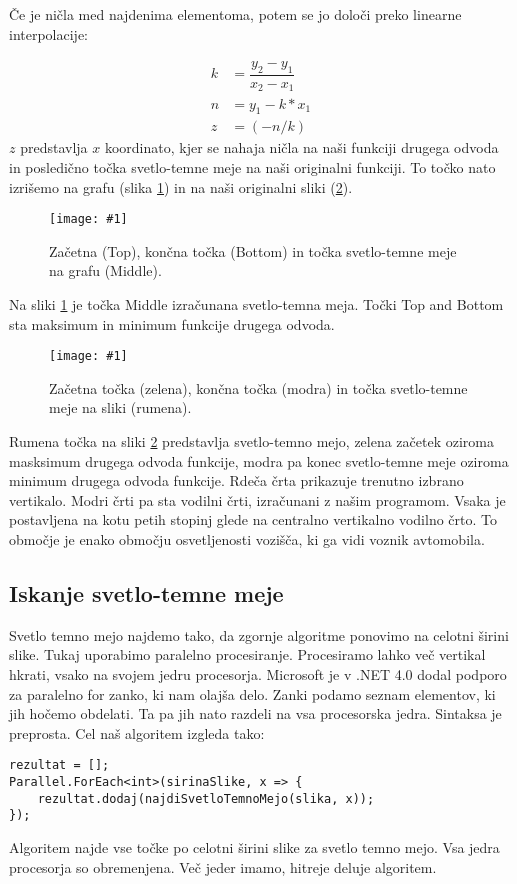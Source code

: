 \documentclass[oneside, a4paper, 12pt]{book}
\newcommand{\slika}[3]{
	\begin{figure}
	\begin{center}
	\texttt{[image: \#1]}
	\end{center}
	\vspace{-20pt}
	\caption{#2}
	\label{#3}
	\end{figure}
}
\begin{document}
Če je ničla med najdenima elementoma, potem se jo določi preko linearne interpolacije:

\begin{align}
k &= \dfrac{y_2-y_1}{x_2-x_1}  \nonumber\\
n &= y_1-k*x_1 \\
z &= (-n/k) \nonumber
\end{align} 
$z$ predstavlja $x$ koordinato, kjer se nahaja ničla na naši funkciji drugega odvoda in posledično točka svetlo-temne meje na naši originalni funkciji. To točko nato izrišemo na grafu (slika \ref{pic:svet-tem}) in na naši originalni sliki (\ref{pic:svet-tem2}).

\slika{slike/svetlo-temna-meja.jpg}{Začetna (Top), končna točka (Bottom) in točka svetlo-temne meje na grafu (Middle).}{pic:svet-tem}

Na sliki \ref{pic:svet-tem} je točka Middle izračunana svetlo-temna meja. Točki Top and Bottom sta maksimum in minimum funkcije drugega odvoda. 


\slika{slike/svetlo-temna-meja-orig-crop.jpg}{Začetna točka (zelena), končna točka (modra) in točka svetlo-temne meje na sliki (rumena).}{pic:svet-tem2}

Rumena točka na sliki \ref{pic:svet-tem2} predstavlja svetlo-temno mejo, zelena začetek oziroma masksimum drugega odvoda funkcije, modra pa konec svetlo-temne meje oziroma minimum drugega odvoda funkcije. Rdeča črta prikazuje trenutno izbrano vertikalo. Modri črti pa sta vodilni črti, izračunani z našim programom. Vsaka je postavljena na kotu petih stopinj glede na centralno vertikalno vodilno črto. To območje je enako območju osvetljenosti vozišča, ki ga vidi voznik avtomobila.


\subsection{Iskanje svetlo-temne meje}
\label{ch:iskanj-sv-t-m}
Svetlo temno mejo najdemo tako, da zgornje algoritme ponovimo na celotni širini slike. Tukaj uporabimo paralelno procesiranje. Procesiramo lahko več vertikal hkrati, vsako na svojem jedru procesorja. Microsoft je v .NET 4.0 dodal podporo za paralelno for zanko, ki nam olajša delo. Zanki podamo seznam elementov, ki jih hočemo obdelati. Ta pa jih nato razdeli na vsa procesorska jedra. Sintaksa je preprosta. Cel naš algoritem izgleda tako:
\begin{samepage}
\begin{verbatim}
rezultat = [];
Parallel.ForEach<int>(sirinaSlike, x => {
    rezultat.dodaj(najdiSvetloTemnoMejo(slika, x));
});
\end{verbatim}
\end{samepage}
Algoritem najde vse točke po celotni širini slike za svetlo temno mejo. Vsa jedra procesorja so obremenjena. Več jeder imamo, hitreje deluje algoritem.
\end{document}
